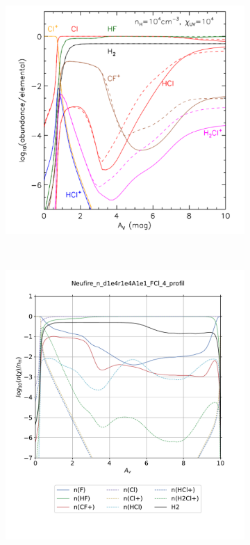 \begin{figure}[htbp]
    \centering
    \begin{subfigure}[t]{0.45\textwidth} %
        \centering \includegraphics[trim = {0 0 0 0cm},clip,width=1\textwidth]{figure/Cl/neufire/dens.pdf}
        \caption{}
    \end{subfigure}
    ~ 
    \begin{subfigure}[t]{0.45\textwidth}
        \centering \includegraphics[trim = {0 2cm 0 1.8cm},clip,width=1\textwidth]{figure/Cl/neufire/HCl_profil.pdf}

\end{subfigure}
\end{figure}
